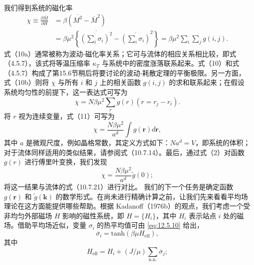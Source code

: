 我们得到系统的磁化率
\begin{equation}\tag{12.11.10}\label{eq:12.11.10}
\begin{aligned}\chi\equiv\frac{\partial\overline{M}}{\partial H}&=\beta(\overline{M^2}-\overline{M}^2)\\&=\beta\mu^2\left\{\overline{\left(\sum_i\sigma_i\right)^2}-\overline{\left(\sum_i\sigma_i\right)}^2\right\}=\beta\mu^2\sum_i\sum_jg(i,j).\end{aligned}
\end{equation}
式（10a）通常被称为波动-磁化率关系；它可与流体的相应关系相比较，即式（4.5.7），该式将等温压缩率 \(\kappa_{T}\) 与系统中的密度涨落联系起来。式（10）和式（4.5.7）构成了第15.6节稍后将要讨论的波动-耗散定理的平衡极限。另一方面，式（10b）则将 \(\chi\) 与所有 \(i\) 和 \(j\) 上的相关函数 \(g(i,j)\) 的求和联系起来；在假设系统均匀性的前提下，这一表达式可写为
\begin{equation}\tag{12.11.11}\label{eq:12.11.11}
\chi = N \beta \mu ^{2} \sum _ { r } g ( r )  ( r = r _ { j } - r _ { i } ) .
\end{equation}
将 \(r\) 视为连续变量，式（11）可写为
\begin{equation}\tag{12.11.12}\label{eq:12.11.12}
\chi = \frac { N \beta \mu ^{2} } { a ^{d} } \int g ( \mathbf { r } ) d \mathbf { r } ,
\end{equation}
其中 \(a\) 是微观尺度，例如晶格常数，其定义方式如下：\(Na^{d}=V\)，即系统的体积；对于流体同样适用的类似结果，请参阅式（10.7.14）。最后，通过式（2）对函数 \(g(r)\) 进行傅里叶变换，我们发现
\begin{equation}\tag{12.11.13}\label{eq:12.11.13}
\chi = \frac { N \beta \mu ^{2} } { a ^{d} } \tilde { g } ( 0 ) ;
\end{equation}
将这一结果与流体的式（10.7.21）进行对比。
我们的下一个任务是确定函数 \(g(\boldsymbol{r})\) 和 \(\tilde{g}(\boldsymbol{k})\) 的数学形式。在尚未进行精确计算之前，让我们先来看看平均场理论在这方面能提供哪些帮助。根据 Kadanoff（1976b）的观点，我们考虑一个受非均匀外部磁场 \(H\) 影响的磁性系统，即 \(H=\{H_{i}\}\)，其中 \(H_{i}\) 表示站点 \(i\) 处的磁场。借助平均场近似，变量 \(\sigma_{i}\) 的热平均值可由 \autoref{eq:12.5.10} 给出，
\begin{equation}\tag{12.11.14}\label{eq:12.11.14}
\overline { { \sigma } } _ { i } = \mathrm { t a n h } ( \beta \mu H _ { \mathrm { e f f } } ) ,
\end{equation}
其中
\begin{equation}\tag{12.11.15}\label{eq:12.11.15}
H _ { \mathrm { e f f } } = H _ { i } + ( J / \mu ) \sum _ { \mathrm { n . n . } } \overline { { \sigma } } _ { j } ;
\end{equation}
